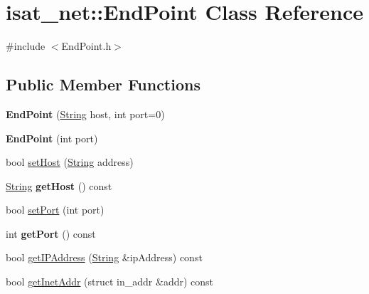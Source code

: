 \hypertarget{classisat__net_1_1_end_point}{}\section{isat\+\_\+net\+:\+:End\+Point Class Reference}
\label{classisat__net_1_1_end_point}


{\ttfamily \#include $<$End\+Point.\+h$>$}

\subsection*{Public Member Functions}
\begin{DoxyCompactItemize}
\item 
{\bfseries End\+Point} (\hyperlink{classisat__utils_1_1_string}{String} host, int port=0)\hypertarget{classisat__net_1_1_end_point_a01c39ec95d01dee0b26b62bd252bfdc0}{}\label{classisat__net_1_1_end_point_a01c39ec95d01dee0b26b62bd252bfdc0}

\item 
{\bfseries End\+Point} (int port)\hypertarget{classisat__net_1_1_end_point_af00285be71b71cb6dd93cf09ab54fd39}{}\label{classisat__net_1_1_end_point_af00285be71b71cb6dd93cf09ab54fd39}

\item 
bool \hyperlink{classisat__net_1_1_end_point_afbbe067c11aab5bb65de09aca5c4aa3a}{set\+Host} (\hyperlink{classisat__utils_1_1_string}{String} address)
\item 
\hyperlink{classisat__utils_1_1_string}{String} {\bfseries get\+Host} () const \hypertarget{classisat__net_1_1_end_point_a4e9cfb1be0f724e75297b2e884ab25a3}{}\label{classisat__net_1_1_end_point_a4e9cfb1be0f724e75297b2e884ab25a3}

\item 
bool \hyperlink{classisat__net_1_1_end_point_a16cf3d8eefa9ef59ba2e0a900d1e6d25}{set\+Port} (int port)
\item 
int {\bfseries get\+Port} () const \hypertarget{classisat__net_1_1_end_point_a80b1837608f51597cbef8951bd352ad4}{}\label{classisat__net_1_1_end_point_a80b1837608f51597cbef8951bd352ad4}

\item 
bool \hyperlink{classisat__net_1_1_end_point_a4473813fe9fbe7c6dbc07a0965b7e961}{get\+I\+P\+Address} (\hyperlink{classisat__utils_1_1_string}{String} \&ip\+Address) const 
\item 
bool \hyperlink{classisat__net_1_1_end_point_aa26abb544d9e5ac9ea5c2bb409447ad4}{get\+Inet\+Addr} (struct in\+\_\+addr \&addr) const 
\end{DoxyCompactItemize}


